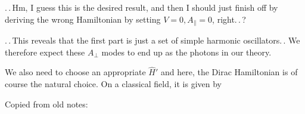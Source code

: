 \documentclass{report}
\begin{document}
.\,.\,Hm, I guess this is the desired result, and then I should just finish off by deriving the wrong Hamiltonian by setting $V=0, A_\parallel=0$, right.\,.\,? 

.\,.\,This reveals that the first part is just a set of simple harmonic oscillators.\,. We therefore expect these $A_\perp$ modes to end up as the photons in our theory. %

We also need to choose an appropriate $\hat H'$ and here, the Dirac Hamiltonian is of course the natural choice. On a classical field, it is given by


Copied from old notes:
\end{document}
